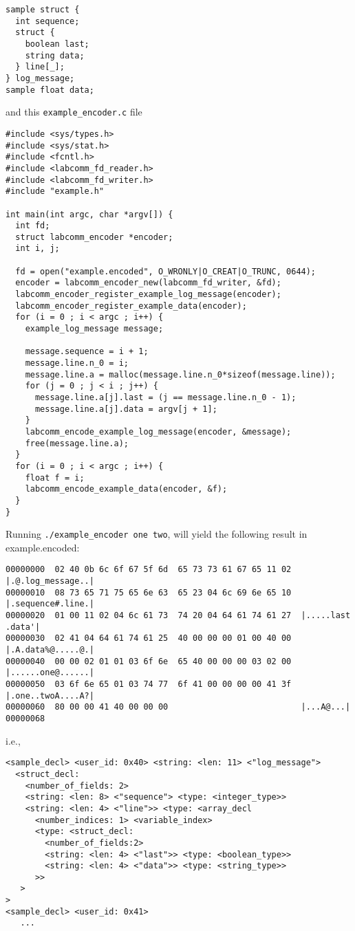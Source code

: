 \documentclass[a4paper]{article}
\begin{document}
\begin{verbatim}
sample struct {
  int sequence;
  struct {
    boolean last;
    string data;
  } line[_];
} log_message;
sample float data;
\end{verbatim}

and this \verb+example_encoder.c+ file 

\begin{verbatim}
#include <sys/types.h>
#include <sys/stat.h>
#include <fcntl.h>
#include <labcomm_fd_reader.h>
#include <labcomm_fd_writer.h>
#include "example.h"

int main(int argc, char *argv[]) {
  int fd;
  struct labcomm_encoder *encoder;
  int i, j;

  fd = open("example.encoded", O_WRONLY|O_CREAT|O_TRUNC, 0644);
  encoder = labcomm_encoder_new(labcomm_fd_writer, &fd);
  labcomm_encoder_register_example_log_message(encoder);
  labcomm_encoder_register_example_data(encoder);
  for (i = 0 ; i < argc ; i++) {
    example_log_message message;

    message.sequence = i + 1;
    message.line.n_0 = i;
    message.line.a = malloc(message.line.n_0*sizeof(message.line));
    for (j = 0 ; j < i ; j++) {
      message.line.a[j].last = (j == message.line.n_0 - 1);
      message.line.a[j].data = argv[j + 1];
    }
    labcomm_encode_example_log_message(encoder, &message);
    free(message.line.a);
  }
  for (i = 0 ; i < argc ; i++) {
    float f = i;
    labcomm_encode_example_data(encoder, &f);
  }
}
\end{verbatim}

Running \verb+./example_encoder one two+, will yield the following result in example.encoded:


\begin{verbatim}
00000000  02 40 0b 6c 6f 67 5f 6d  65 73 73 61 67 65 11 02  |.@.log_message..|
00000010  08 73 65 71 75 65 6e 63  65 23 04 6c 69 6e 65 10  |.sequence#.line.|
00000020  01 00 11 02 04 6c 61 73  74 20 04 64 61 74 61 27  |.....last .data'|
00000030  02 41 04 64 61 74 61 25  40 00 00 00 01 00 40 00  |.A.data%@.....@.|
00000040  00 00 02 01 01 03 6f 6e  65 40 00 00 00 03 02 00  |......one@......|
00000050  03 6f 6e 65 01 03 74 77  6f 41 00 00 00 00 41 3f  |.one..twoA....A?|
00000060  80 00 00 41 40 00 00 00                           |...A@...|
00000068
\end{verbatim}

i.e.,
\begin{verbatim}
<sample_decl> <user_id: 0x40> <string: <len: 11> <"log_message"> 
  <struct_decl: 
    <number_of_fields: 2>
    <string: <len: 8> <"sequence"> <type: <integer_type>>
    <string: <len: 4> <"line">> <type: <array_decl 
      <number_indices: 1> <variable_index> 
      <type: <struct_decl: 
        <number_of_fields:2>
        <string: <len: 4> <"last">> <type: <boolean_type>> 
        <string: <len: 4> <"data">> <type: <string_type>>
      >>
   >
>
<sample_decl> <user_id: 0x41>
   ...
\end{verbatim}
\end{document}
